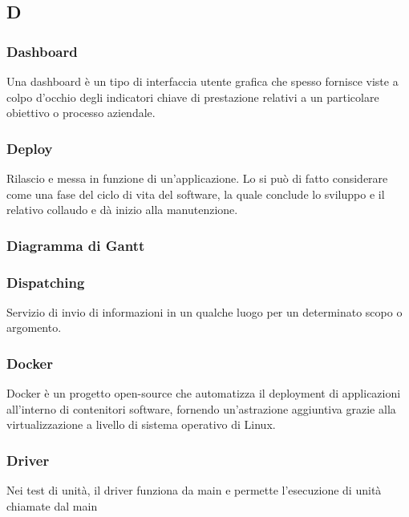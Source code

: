 \subsection*{\textbf{\hfill \Huge{D} \hfill}} 
\subsubsection*{Dashboard}
Una dashboard è un tipo di interfaccia utente grafica che spesso fornisce viste a colpo d’occhio degli indicatori chiave di prestazione relativi a un particolare obiettivo o processo aziendale.
\subsubsection*{Deploy}
Rilascio e messa in funzione di un'applicazione. Lo si può di fatto considerare come una fase del ciclo di vita del software, la quale conclude lo sviluppo e il relativo collaudo e dà inizio alla manutenzione.
\subsubsection*{Diagramma di Gantt}

\subsubsection*{Dispatching}
Servizio di invio di informazioni in un qualche luogo per un determinato scopo o argomento.
\subsubsection*{Docker}
Docker è un progetto open-source che automatizza il deployment di applicazioni all'interno di contenitori software, fornendo un'astrazione aggiuntiva grazie alla virtualizzazione a livello di sistema operativo di Linux.
\subsubsection*{Driver}
Nei test di unità, il driver funziona da main e permette l'esecuzione di unità chiamate dal main
